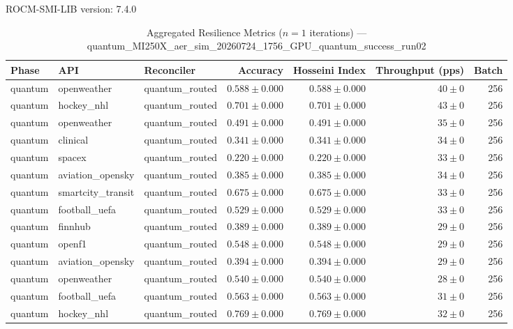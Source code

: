 ROCM-SMI-LIB version: 7.4.0

\begin{table}[htbp]
\caption{Aggregated Resilience Metrics ($n=1$ iterations) --- quantum_MI250X_aer_sim_20260724_1756_GPU_quantum_success_run02}
\begin{tabular}{l l l r r r r}
\hline
Phase & API & Reconciler & Accuracy & Hosseini Index & Throughput (pps) & Batch \\
\hline
quantum & openweather & quantum\_routed & $0.588\pm0.000$ & $0.588\pm0.000$ & $40\pm0$ & 256 \\
quantum & hockey\_nhl & quantum\_routed & $0.701\pm0.000$ & $0.701\pm0.000$ & $43\pm0$ & 256 \\
quantum & openweather & quantum\_routed & $0.491\pm0.000$ & $0.491\pm0.000$ & $35\pm0$ & 256 \\
quantum & clinical & quantum\_routed & $0.341\pm0.000$ & $0.341\pm0.000$ & $34\pm0$ & 256 \\
quantum & spacex & quantum\_routed & $0.220\pm0.000$ & $0.220\pm0.000$ & $33\pm0$ & 256 \\
quantum & aviation\_opensky & quantum\_routed & $0.385\pm0.000$ & $0.385\pm0.000$ & $34\pm0$ & 256 \\
quantum & smartcity\_transit & quantum\_routed & $0.675\pm0.000$ & $0.675\pm0.000$ & $33\pm0$ & 256 \\
quantum & football\_uefa & quantum\_routed & $0.529\pm0.000$ & $0.529\pm0.000$ & $33\pm0$ & 256 \\
quantum & finnhub & quantum\_routed & $0.389\pm0.000$ & $0.389\pm0.000$ & $29\pm0$ & 256 \\
quantum & openf1 & quantum\_routed & $0.548\pm0.000$ & $0.548\pm0.000$ & $29\pm0$ & 256 \\
quantum & aviation\_opensky & quantum\_routed & $0.394\pm0.000$ & $0.394\pm0.000$ & $29\pm0$ & 256 \\
quantum & openweather & quantum\_routed & $0.540\pm0.000$ & $0.540\pm0.000$ & $28\pm0$ & 256 \\
quantum & football\_uefa & quantum\_routed & $0.563\pm0.000$ & $0.563\pm0.000$ & $31\pm0$ & 256 \\
quantum & hockey\_nhl & quantum\_routed & $0.769\pm0.000$ & $0.769\pm0.000$ & $32\pm0$ & 256 \\

\end{tabular}
\end{table}
